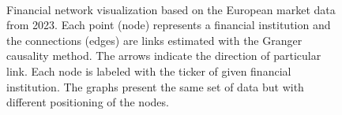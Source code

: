 \documentclass[12pt]{article}
\begin{document}
\begin{figure}%
	\centering
	\quad
	\\
	
	
	\caption{Financial network visualization based on the European market data from 2023. Each point (node) represents a financial institution and the connections (edges) are links estimated with the Granger causality method. The arrows indicate the direction of particular link. Each node is labeled with the ticker of given financial institution. The graphs present the same set of data but with different positioning of the nodes.}	\label{fig:actual_network}
\end{figure}
\end{document}
